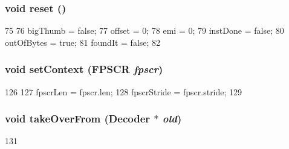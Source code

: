 \hypertarget{classArmISA_1_1Decoder_ad20897c5c8bd47f5d4005989bead0e55}{
\subsubsection[{reset}]{\setlength{\rightskip}{0pt plus 5cm}void reset ()}}
\label{classArmISA_1_1Decoder_ad20897c5c8bd47f5d4005989bead0e55}



\begin{DoxyCode}
75     {
76         bigThumb = false;
77         offset = 0;
78         emi = 0;
79         instDone = false;
80         outOfBytes = true;
81         foundIt = false;
82     }
\end{DoxyCode}
\hypertarget{classArmISA_1_1Decoder_a8cecf05175fd0678cf9a71177c52839f}{
\subsubsection[{setContext}]{\setlength{\rightskip}{0pt plus 5cm}void setContext (FPSCR {\em fpscr})}}
\label{classArmISA_1_1Decoder_a8cecf05175fd0678cf9a71177c52839f}



\begin{DoxyCode}
126     {
127         fpscrLen = fpscr.len;
128         fpscrStride = fpscr.stride;
129     }
\end{DoxyCode}
\hypertarget{classArmISA_1_1Decoder_a83393f90e7cbd98eda9721ba6022d0e0}{
\subsubsection[{takeOverFrom}]{\setlength{\rightskip}{0pt plus 5cm}void takeOverFrom ({\bf Decoder} $\ast$ {\em old})}}
\label{classArmISA_1_1Decoder_a83393f90e7cbd98eda9721ba6022d0e0}



\begin{DoxyCode}
131 {}
\end{DoxyCode}


